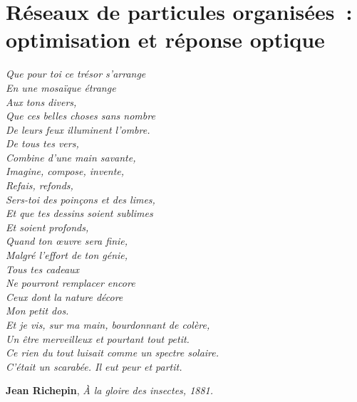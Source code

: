 \documentclass[12pt,french]{report}
\begin{document}
\chapter{Réseaux de particules organisées~: optimisation et réponse optique}
\begin{flushleft}
\textit{
\og Que pour toi ce trésor s’arrange\\	
En une mosaïque étrange	\\
\hspace{12pt}Aux tons divers,	\\
Que ces belles choses sans nombre	\\
De leurs feux illuminent l’ombre.\\	
\hspace{12pt}De tous tes vers,\\
\vspace{12pt}
Combine d’une main savante,	\\
Imagine, compose, invente,	\\
\hspace{12pt}Refais, refonds,	\\
Sers-toi des poinçons et des limes,	\\
Et que tes dessins soient sublimes	\\
\hspace{12pt}Et soient profonds,\\
\vspace{12pt}
Quand ton œuvre sera finie,	\\
Malgré l’effort de ton génie,	\\
\hspace{12pt}Tous tes cadeaux	\\
Ne pourront remplacer encore	\\
Ceux dont la nature décore	\\
\hspace{12pt}Mon petit dos.\fg [...]\\
\vspace{12pt}
Et je vis, sur ma main, bourdonnant de colère,\\	
Un être merveilleux et pourtant tout petit.	\\
Ce rien du tout luisait comme un spectre solaire.\\	
C’était un scarabée. Il eut peur et partit.}
\end{flushleft}
\begin{flushright}
\textbf{Jean Richepin}, \textit{À la gloire des insectes, 1881.}
\end{flushright}

\end{document}

